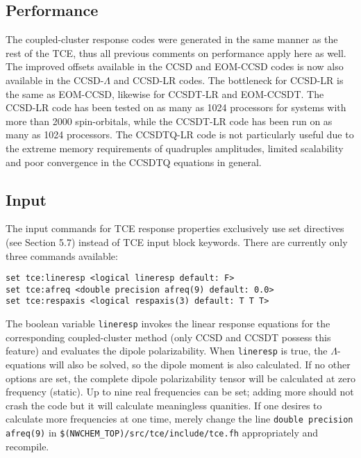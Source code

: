 \subsection{Performance}

The coupled-cluster response codes were generated in the same manner as the rest of the TCE, thus all previous comments on performance apply here as well.  The improved offsets available in the CCSD and EOM-CCSD codes is now also available in the CCSD-$\Lambda$ and CCSD-LR codes.  The bottleneck for CCSD-LR is the same as EOM-CCSD, likewise for CCSDT-LR and EOM-CCSDT.  The CCSD-LR code has been tested on as many as 1024 processors for systems with more than 2000 spin-orbitals, while the CCSDT-LR code has been run on as many as 1024 processors.  The CCSDTQ-LR code is not particularly useful due to the extreme memory requirements of quadruples amplitudes, limited scalability and poor convergence in the CCSDTQ equations in general.

\subsection{Input}

The input commands for TCE response properties exclusively use set directives (see Section 5.7) instead of TCE input block keywords.  There are currently only three commands available:

\begin{verbatim}
set tce:lineresp <logical lineresp default: F>
set tce:afreq <double precision afreq(9) default: 0.0>
set tce:respaxis <logical respaxis(3) default: T T T>
\end{verbatim}

The boolean variable \verb+lineresp+ invokes the linear response equations for the corresponding coupled-cluster method (only CCSD and CCSDT possess this feature) and evaluates the dipole polarizability.  When \verb+lineresp+ is true, the $\Lambda$-equations will also be solved, so the dipole moment is also calculated.  If no other options are set, the complete dipole polarizability tensor will be calculated at zero frequency (static). Up to nine real frequencies can be set; adding more should not crash the code but it will calculate meaningless quanities.  If one desires to calculate more frequencies at one time, merely change the line \verb+double precision afreq(9)+ in \verb+$(NWCHEM_TOP)/src/tce/include/tce.fh+ appropriately and recompile.

